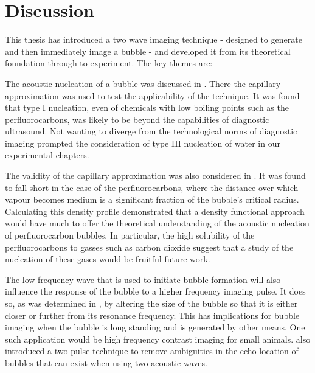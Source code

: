 

\chapter{Discussion}\label{ch:discussion}


This thesis has introduced a two wave imaging technique 
- designed to generate and then immediately image a bubble -
and developed it from its theoretical foundation through to experiment.
The key themes are:

The acoustic nucleation of a bubble was discussed in .
There the capillary approximation was used to test the applicability of the technique.
It was found that type I nucleation, 
even of chemicals with low boiling points such as the perfluorocarbons,
was likely to be beyond the capabilities of diagnostic ultrasound.
Not wanting to diverge from the technological norms of diagnostic imaging 
prompted the consideration of type III nucleation of water in our experimental chapters.

The validity of the capillary approximation was also considered in .
It was found to fall short in the case of the perfluorocarbons, 
where the distance over which vapour becomes medium is a significant fraction of the bubble's critical radius.
Calculating this density profile demonstrated that a density functional approach would have much to offer
the theoretical understanding of the acoustic nucleation of perfluorocarbon bubbles.
In particular, 
the high solubility of the perfluorocarbons to gasses such as carbon dioxide suggest that a 
study of the nucleation of these gases would be fruitful future work.


The low frequency wave that is used to initiate bubble formation will also influence the response of the bubble to a higher frequency imaging pulse.
It does so, 
as was determined in ,
by altering the size of the bubble so that it is either closer or further from its resonance frequency.
This
has implications for bubble imaging when the bubble is long standing and is generated by other means.
One such application would be high frequency contrast imaging for small animals.
 also introduced a two pulse technique to remove ambiguities
in the echo location of bubbles that can exist when using two acoustic waves.

